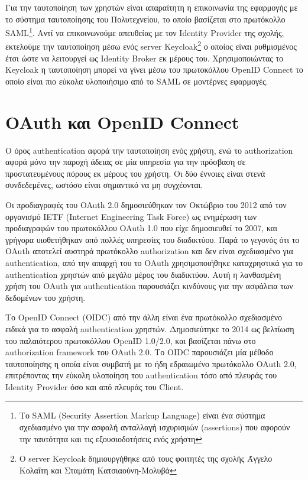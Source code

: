 \documentclass[../thesis.tex]{subfiles}
\begin{document}
Για την ταυτοποίηση των χρηστών είναι απαραίτητη η επικοινωνία της εφαρμογής με το σύστημα ταυτοποίησης του Πολυτεχνείου, το οποίο βασίζεται στο πρωτόκολλο SAML\footnote{Το SAML (Security Assertion Markup Language) είναι ένα σύστημα σχεδιασμένο για την ασφαλή ανταλλαγή ισχυρισμών (assertions) που αφορούν την ταυτότητα και τις εξουσιοδοτήσεις ενός χρήστη}.
Αντί να επικοινωνούμε απευθείας με τον Identity Provider της σχολής, εκτελούμε την ταυτοποίηση μέσω ενός server Keycloak\footnote{Ο server Keycloak δημιουργήθηκε από τους φοιτητές της σχολής Άγγελο Κολαΐτη και Σταμάτη Κατσιαούνη-Μολυβά } ο οποίος είναι ρυθμισμένος έτσι ώστε να λειτουργεί ως Identity Broker εκ μέρους του.
Χρησιμοποιώντας το Keycloak η ταυτοποίηση μπορεί να γίνει μέσω του πρωτοκόλλου OpenID Connect το οποίο είναι πιο εύκολα υλοποιήσιμο από το SAML σε μοντέρνες εφαρμογές.

\section{OAuth και OpenID Connect}
Ο όρος authentication αφορά την ταυτοποίηση ενός χρήστη, ενώ το authorization αφορά μόνο την παροχή άδειας σε μία υπηρεσία για την πρόσβαση σε προστατευμένους πόρους εκ μέρους του χρήστη.
Οι δύο έννοιες είναι στενά συνδεδεμένες, ωστόσο είναι σημαντικό να μη συγχέονται.

Οι προδιαγραφές του OAuth 2.0 δημοσιεύθηκαν τον Οκτώβριο του 2012 από τον οργανισμό IETF (Internet Engineering Task Force) ως ενημέρωση των προδιαγραφών του πρωτοκόλλου OAuth 1.0 που είχε δημοσιευθεί το 2007, και γρήγορα υιοθετήθηκαν από πολλές υπηρεσίες του διαδικτύου.
Παρά το γεγονός ότι το OAuth αποτελεί αυστηρά πρωτόκολλο authorization και δεν είναι σχεδιασμένο για authentication, από την απαρχή του το OAuth χρησιμοποιήθηκε καταχρηστικά για το authentication χρηστών από μεγάλο μέρος του διαδικτύου.
Αυτή η λανθασμένη χρήση του OAuth για authentication παρουσιάζει κινδύνους για την ασφάλεια των δεδομένων του χρήστη\cite{oauth_net}.

Το OpenID Connect (OIDC) από την άλλη είναι ένα πρωτόκολλο σχεδιασμένο ειδικά για το ασφαλή authentication χρηστών.
Δημοσιεύτηκε το 2014 ως βελτίωση του παλαιότερου πρωτοκόλλου OpenID 1.0/2.0, και βασίζεται πάνω στο authorization framework του OAuth 2.0.
Το OIDC παρουσιάζει μία μέθοδο ταυτοποίησης η οποία είναι συμβατή με το ήδη εδραιωμένο πρωτόκολλο OAuth 2.0, επιτρέποντας την εύκολη υλοποίηση του authentication τόσο από πλευράς του Identity Provider όσο και από πλευράς του Client\cite{oidc_faq}.
\end{document}
